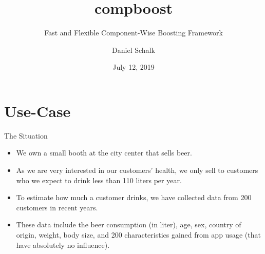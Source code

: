 \documentclass[10pt]{beamer}\usepackage[]{graphicx}\usepackage[]{color}
\title{compboost}
\subtitle{Fast and Flexible Component-Wise Boosting Framework}
\date{July 12, 2019}
\author{Daniel Schalk}
\institute{LMU Munich\\Working Group Computational Statistics}
\begin{document}



\maketitle



\section{Use-Case}

\begin{frame}{The Situation}

\begin{itemize}
  \item
    We own a small booth at the city center that sells beer.

  \item
    As we are very interested in our customers' health, we only sell to customers who we expect to drink less than 110 liters per year.

  \item
    To estimate how much a customer drinks, we have collected data from 200 customers in recent years.

  \item
    These data include the beer consumption (in liter), age, sex, country of origin, weight, body size, and 200 characteristics gained from app usage (that have absolutely no influence).
\end{itemize}

\end{frame}
\end{document}
